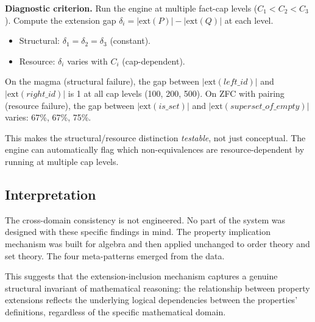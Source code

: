 \noindent \textbf{Diagnostic criterion.} Run the engine at multiple fact-cap levels ($C_1 < C_2 < C_3$). Compute the extension gap $\delta_i = |\mathrm{ext}(P)| - |\mathrm{ext}(Q)|$ at each level.

\begin{itemize}
\item Structural: $\delta_1 = \delta_2 = \delta_3$ (constant).
\item Resource: $\delta_i$ varies with $C_i$ (cap-dependent).
\end{itemize}

\noindent On the magma (structural failure), the gap between $|\mathrm{ext}(\mathit{left\_id})|$ and $|\mathrm{ext}(\mathit{right\_id})|$ is 1 at all cap levels (100, 200, 500). On ZFC with pairing (resource failure), the gap between $|\mathrm{ext}(\mathit{is\_set})|$ and $|\mathrm{ext}(\mathit{superset\_of\_empty})|$ varies: 67\%, 67\%, 75\%.

This makes the structural/resource distinction \emph{testable}, not just conceptual. The engine can automatically flag which non-equivalences are resource-dependent by running at multiple cap levels.

\subsection{Interpretation}

The cross-domain consistency is not engineered. No part of the system was designed with these specific findings in mind. The property implication mechanism was built for algebra and then applied unchanged to order theory and set theory. The four meta-patterns emerged from the data.

This suggests that the extension-inclusion mechanism captures a genuine structural invariant of mathematical reasoning: the relationship between property extensions reflects the underlying logical dependencies between the properties' definitions, regardless of the specific mathematical domain.
